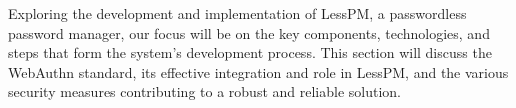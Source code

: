 Exploring the development and implementation of LessPM, a passwordless password manager, our focus will be on the key
components, technologies, and steps that form the system's development process.
This section will discuss the WebAuthn standard, its effective integration and role in LessPM, and the various security
measures contributing to a robust and reliable solution.

%


